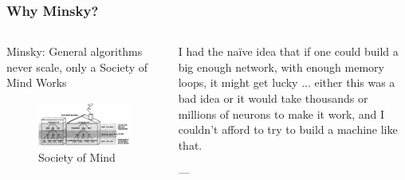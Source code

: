 \documentclass{beamer}
\begin{document}
\begin{frame}
\frametitle{Why Minsky?}

\begin{columns}
    \begin{column}{0.5\textwidth}
        Minsky: General algorithms never scale, only a Society of Mind Works
        \begin{figure}[t]
            \includegraphics[width=\textwidth]{figure/Society_of_Mind.png}
            \centering
            \caption{Society of Mind \cite[section 8.6]{minskySocietyMind1988}}
        \end{figure}
    \end{column}
    
    \begin{column}{0.5\textwidth}
    \begin{displayquote}
        I had the naïve idea that if one could build a big enough network, with enough memory loops, it might get lucky ... either this was a bad idea or it would take thousands or millions of neurons to make it work, and I couldn't afford to try to build a machine like that.

        --- \cite{bernsteinMarvinMinskyVision1981}
    \end{displayquote}
    \end{column}
\end{columns}

\end{frame}
\end{document}
